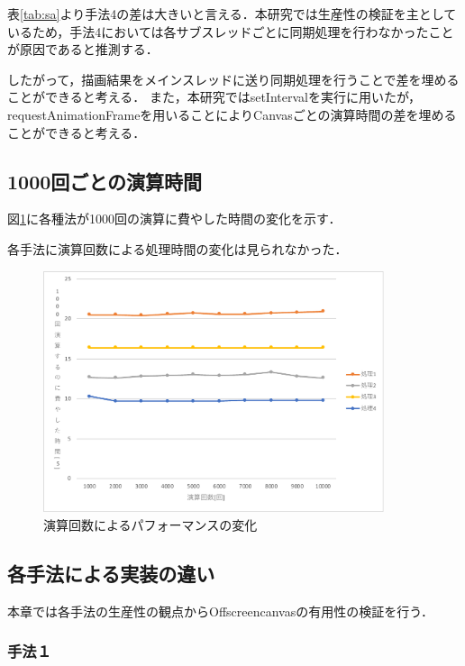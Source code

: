 \documentclass[a4j,12pt]{jsarticle}
\begin{document}
表\ref{tab:sa}より手法4の差は大きいと言える．本研究では生産性の検証を主としているため，手法4においては各サブスレッドごとに同期処理を行わなかったことが原因であると推測する．

したがって，描画結果をメインスレッドに送り同期処理を行うことで差を埋めることができると考える．
また，本研究ではsetIntervalを実行に用いたが，requestAnimationFrameを用いることによりCanvasごとの演算時間の差を埋めることができると考える．

\subsection{1000回ごとの演算時間}
図\ref{fig:henka}に各種法が1000回の演算に費やした時間の変化を示す．

各手法に演算回数による処理時間の変化は見られなかった．

\begin{figure}[htbp]
 \begin{center}
  \includegraphics[width=100mm]{henka.pdf}
 \end{center}
 \caption{演算回数によるパフォーマンスの変化}
 \label{fig:henka}
\end{figure}
\newpage

\subsection{各手法による実装の違い}
本章では各手法の生産性の観点からOffscreencanvasの有用性の検証を行う．
\subsubsection{手法１}
\end{document}
